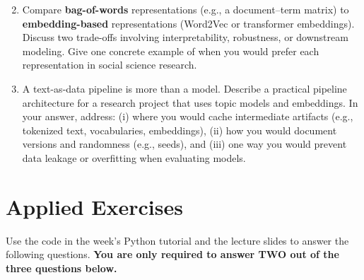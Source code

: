 \documentclass[11pt]{article}
\begin{document}
\begin{enumerate}
\setcounter{enumi}{1}
\item Compare \textbf{bag-of-words} representations (e.g., a document--term matrix) to \textbf{embedding-based} representations (Word2Vec or transformer embeddings). Discuss two trade-offs involving interpretability, robustness, or downstream modeling. Give one concrete example of when you would prefer each representation in social science research.

\item A text-as-data pipeline is more than a model. Describe a practical pipeline architecture for a research project that uses topic models and embeddings. In your answer, address:  
(i) where you would cache intermediate artifacts (e.g., tokenized text, vocabularies, embeddings),  
(ii) how you would document versions and randomness (e.g., seeds), and  
(iii) one way you would prevent data leakage or overfitting when evaluating models.

\end{enumerate}

\section*{Applied Exercises}

Use the code in the week’s Python tutorial and the lecture slides to answer the following questions. \textbf{You are only required to answer TWO out of the three questions below.} \bigskip
\end{document}
